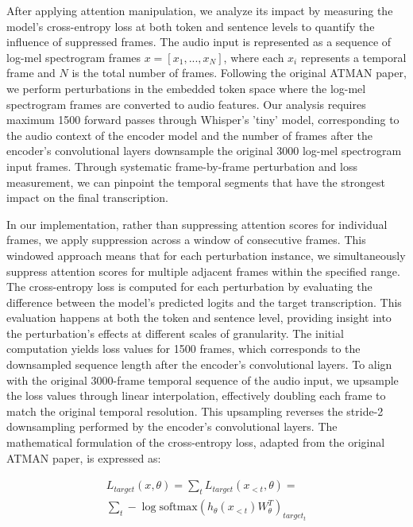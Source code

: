 \documentclass[../report.tex]{subfiles}
\begin{document}
    After applying attention manipulation, we analyze its impact by measuring the model's cross-entropy loss at both token and sentence levels to quantify the influence of suppressed frames. The audio input is represented as a sequence of log-mel spectrogram frames $x = [x_1, ..., x_N]$, where each $x_i$ represents a temporal frame and $N$ is the total number of frames. Following the original ATMAN paper, we perform perturbations in the embedded token space where the log-mel spectrogram frames are converted to audio features. Our analysis requires maximum 1500 forward passes through Whisper's 'tiny' model, corresponding to the audio context of the encoder model and the number of frames after the encoder's convolutional layers downsample the original 3000 log-mel spectrogram input frames. Through systematic frame-by-frame perturbation and loss measurement, we can pinpoint the temporal segments that have the strongest impact on the final transcription.

    In our implementation, rather than suppressing attention scores for individual frames, we apply suppression across a window of consecutive frames. This windowed approach means that for each perturbation instance, we simultaneously suppress attention scores for multiple adjacent frames within the specified range.
    The cross-entropy loss is computed for each perturbation by evaluating the difference between the model's predicted logits and the target transcription. This evaluation happens at both the token and sentence level, providing insight into the perturbation's effects at different scales of granularity. The initial computation yields loss values for 1500 frames, which corresponds to the downsampled sequence length after the encoder's convolutional layers. To align with the original 3000-frame temporal sequence of the audio input, we upsample the loss values through linear interpolation, effectively doubling each frame to match the original temporal resolution. This upsampling reverses the stride-2 downsampling performed by the encoder's convolutional layers. The mathematical formulation of the cross-entropy loss, adapted from the original ATMAN paper, is expressed as:

    \begin{equation}
    \begin{split}
        L_{target}(x, \theta) = \sum_{t} L_{target}(x_{<t}, \theta) = \\
        \sum_{t} -\log \text{softmax}(h_\theta(x_{<t})W^T_\theta)_{target_t}
    \end{split}
    \label{eq:cross_entropy_loss}
    \end{equation}
\end{document}
